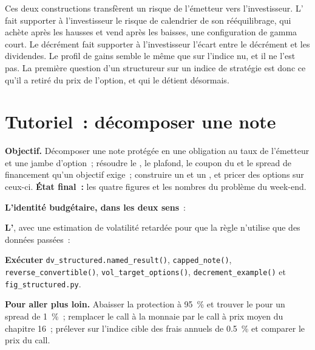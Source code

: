 Ces deux constructions transfèrent un risque de l'émetteur vers l'investisseur. L' fait supporter à l'investisseur le risque de calendrier de son rééquilibrage,
qui achète après les hausses et vend après les baisses, une configuration de gamma court. Le décrément fait supporter à l'investisseur l'écart entre le décrément et
les dividendes. Le profil de gains semble le même que sur l'indice nu, et il ne l'est pas. La première question d'un structureur sur un indice de stratégie est
donc ce qu'il a retiré du prix de l'option, et qui le détient désormais.

\section{Tutoriel~: décomposer une note}\label{tut:dv:the-structured-products-business:tut}

\begin{tutorial}
\textbf{Objectif.} Décomposer une note protégée en une obligation au taux de l'émetteur et une jambe d'option~; résoudre le , le plafond, le
coupon du  et le spread de financement qu'un objectif exige~; construire un  et un , et pricer des
options sur ceux-ci. \textbf{État final~:} les quatre figures et les nombres du problème du week-end.
\begin{tutsteps}
\item \textbf{L'identité budgétaire, dans les deux sens}~:
\label{lst:dv:the-structured-products-business:budget}
\item \textbf{L'}, avec une estimation de volatilité retardée pour que la règle n'utilise que des données passées~:
\label{lst:dv:the-structured-products-business:vt}
\item \textbf{Exécuter} \texttt{dv\_structured.named\_result()}, \texttt{capped\_note()}, \texttt{reverse\_convertible()},
\texttt{vol\_target\_options()}, \texttt{decrement\_example()} et \texttt{fig\_structured.py}.
\end{tutsteps}
\textbf{Pour aller plus loin.} Abaisser la protection à 95~\% et trouver le  pour un spread de 1~\%~; remplacer le call à la monnaie par le
call à prix moyen du chapitre 16~; prélever sur l'indice cible des frais annuels de 0.5~\% et comparer le prix du call.
\end{tutorial}

